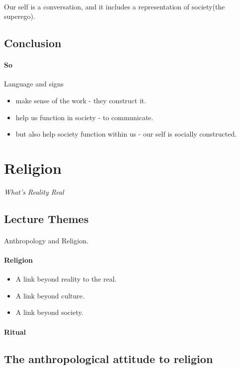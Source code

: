 \documentclass{article}
\begin{document}
	\paragraph{} Our self is a conversation, and it includes a representation of society(the superego).
	
	\subsection{Conclusion}
	\paragraph{So } Language and signs
	\begin{itemize}
	   \item  make sense of the work - they construct it.
	   \item help us function in society - to communicate.
	   \item but also help society function within us - our self is socially constructed.   
	\end{itemize}

	\section{Religion}
	\emph{What's Reality Real}

	\subsection{Lecture Themes}
	\paragraph{} Anthropology and Religion.
	\paragraph{Religion}
	\begin{itemize}
		\item A link beyond reality to the real.
		\item A link beyond culture.
		\item A link beyond society.
	\end{itemize}
	\paragraph{Ritual}

	\subsection{The anthropological attitude to religion}
\end{document}
